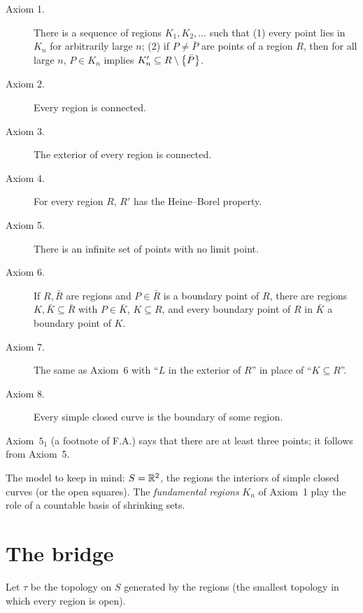 \begin{definition}\label{def:moore-axioms}
\leavevmode
\begin{description}
\item[Axiom 1.] There is a sequence of regions $K_1,K_2,\dots$ such that (1) every point lies in $K_n$
for arbitrarily large $n$; (2) if $P\ne\bar P$ are points of a region $R$, then for all large $n$,
$P\in K_n$ implies $K_n'\subseteq R\setminus\left\{ \bar P \right\}$.
\item[Axiom 2.] Every region is connected.
\item[Axiom 3.] The exterior of every region is connected.
\item[Axiom 4.] For every region $R$, $R'$ has the Heine--Borel property.
\item[Axiom 5.] There is an infinite set of points with no limit point.
\item[Axiom 6.] If $R,\bar R$ are regions and $P\in\bar R$ is a boundary point of $R$, there are regions
$K,\bar K\subseteq\bar R$ with $P\in\bar K$, $K\subseteq R$, and every boundary point of $R$ in $\bar K$ a
boundary point of $K$.
\item[Axiom 7.] The same as Axiom~6 with ``$L$ in the exterior of $R$'' in place of ``$K\subseteq R$''.
\item[Axiom 8.] Every simple closed curve is the boundary of some region.
\end{description}
Axiom~$5_1$ (a footnote of F.A.) says that there are at least three points; it follows from Axiom~5.
\end{definition}


The model to keep in mind: $S=\mathbb{R}^2$, the regions the interiors of simple closed curves (or the open
squares). The \emph{fundamental regions} $K_n$ of Axiom~1 play the role of a countable basis of
shrinking sets.

\section{The bridge}

Let $\tau$ be the topology on $S$ generated by the regions (the smallest topology in which every region
is open).


